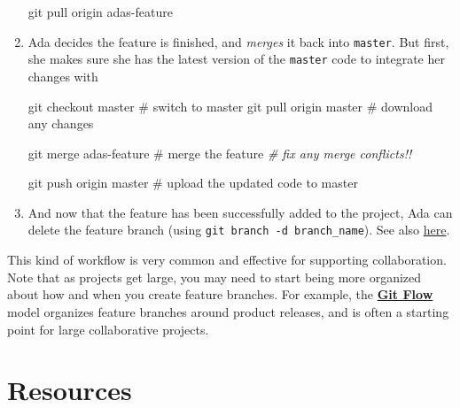 \documentclass[]{book}
\newenvironment{Shaded}{\begin{snugshade}}{\end{snugshade}}
\newcommand{\CommentTok}[1]{\textcolor[rgb]{0.56,0.35,0.01}{\textit{#1}}}
\newcommand{\FunctionTok}[1]{\textcolor[rgb]{0.00,0.00,0.00}{#1}}
\newcommand{\NormalTok}[1]{#1}
\theoremstyle{definition}
\theoremstyle{definition}
\theoremstyle{remark}
\begin{document}
\begin{enumerate}
\begin{Shaded}
\begin{Highlighting}[]
\FunctionTok{git}\NormalTok{ pull origin adas-feature}
\end{Highlighting}
\end{Shaded}
\item
  Ada decides the feature is finished, and \emph{merges} it back into
  \texttt{master}. But first, she makes sure she has the latest version
  of the \texttt{master} code to integrate her changes with

\begin{Shaded}
\begin{Highlighting}[]
\FunctionTok{git}\NormalTok{ checkout master  # switch to master}
\FunctionTok{git}\NormalTok{ pull origin master  # download any changes}

\FunctionTok{git}\NormalTok{ merge adas-feature  # merge the feature}
\CommentTok{# fix any merge conflicts!!}

\FunctionTok{git}\NormalTok{ push origin master  # upload the updated code to master}
\end{Highlighting}
\end{Shaded}
\item
  And now that the feature has been successfully added to the project,
  Ada can delete the feature branch (using
  \texttt{git\ branch\ -d\ branch\_name}). See also
  \href{http://stackoverflow.com/questions/2003505/how-to-delete-a-git-branch-both-locally-and-remotely}{here}.
\end{enumerate}

This kind of workflow is very common and effective for supporting
collaboration. Note that as projects get large, you may need to start
being more organized about how and when you create feature branches. For
example, the
\href{http://nvie.com/posts/a-successful-git-branching-model/}{\textbf{Git
Flow}} model organizes feature branches around product releases, and is
often a starting point for large collaborative projects.

\section*{Resources}\label{resources-13}
\end{document}
